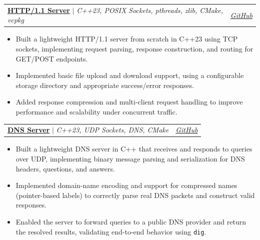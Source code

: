 \documentclass[letterpaper,11pt]{article}
\makeatletter
\newcommand{\resumeItem}[1]{
  \item\small{
    {#1 \vspace{-2pt}}
  }
}
\newcommand{\resumeProjectHeading}[2]{
    \item
    \begin{tabular*}{0.97\textwidth}{l@{\extracolsep{\fill}}r}
      \small#1 & #2 \\
    \end{tabular*}\vspace{-7pt}
}
\newcommand{\resumeItemListStart}{\begin{itemize}}
\newcommand{\resumeItemListEnd}{\end{itemize}\vspace{-5pt}}
\makeatother
\begin{document}
        \resumeProjectHeading
        {\textbf{\href{https://GitHub.com/matoanbach/http-server/}{HTTP/1.1 Server}} $|$ \emph{C++23, POSIX Sockets, pthreads, zlib, CMake, vcpkg}}{\emph{\href{https://GitHub.com/matoanbach/http-server}{GitHub}}}
        \resumeItemListStart
          \resumeItem{Built a lightweight HTTP/1.1 server from scratch in C++23 using TCP sockets, implementing request parsing, response construction, and routing for GET/POST endpoints.}
        \resumeItem{Implemented basic file upload and download support, using a configurable storage directory and appropriate success/error responses.}
        \resumeItem{Added response compression and multi-client request handling to improve performance and scalability under concurrent traffic.}
        \resumeItemListEnd

    
        \resumeProjectHeading
        {\textbf{\href{https://GitHub.com/matoanbach/dns-server/tree/main}{DNS Server}} $|$ \emph{C++23, UDP Sockets, DNS, CMake}}{\emph{\href{https://GitHub.com/matoanbach/dns-server/tree/main}{GitHub}}}
        \resumeItemListStart
          \resumeItem{Built a lightweight DNS server in C++ that receives and responds to queries over UDP, implementing binary message parsing and serialization for DNS headers, questions, and answers.}
          \resumeItem{Implemented domain-name encoding and support for compressed names (pointer-based labels) to correctly parse real DNS packets and construct valid responses.}
          \resumeItem{Enabled the server to forward queries to a public DNS provider and return the resolved results, validating end-to-end behavior using \texttt{dig}.}
        \resumeItemListEnd

    

        
\end{document}
